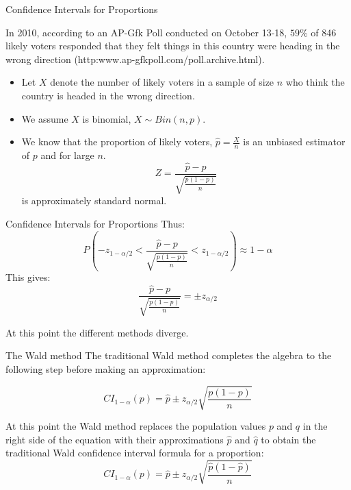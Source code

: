 \documentclass[
  ignorenonframetext,
]{beamer}
\begin{document}
\begin{frame}{Confidence Intervals for Proportions}
\protect\hypertarget{confidence-intervals-for-proportions}{}
\begin{tcolorbox}
In 2010, according to an AP-Gfk Poll conducted on October 13-18, $59\%$ of 846 likely voters responded that they felt things in this country were heading in the wrong direction (http:www.ap-gfkpoll.com/poll.archive.html). 
\end{tcolorbox}

\begin{itemize}
\item
  Let \(X\) denote the number of likely voters in a sample of size \(n\)
  who think the country is headed in the wrong direction.
\item
  We assume \(X\) is binomial, \(X\sim Bin(n, p)\).
\item
  We know that the proportion of likely voters, \(\hat{p}=\frac{X}{n}\)
  is an unbiased estimator of \(p\) and for large \(n\).
  \[Z=\frac{\hat{p}-p}{\sqrt{\frac{p(1-p)}{n}}}\] is approximately
  standard normal.
\end{itemize}
\end{frame}

\begin{frame}{Confidence Intervals for Proportions}
\protect\hypertarget{confidence-intervals-for-proportions-1}{}
Thus:
\[P\left(-z_{1-\alpha/2}<\frac{\hat{p}-p}{\sqrt{\frac{p(1-p)}{n}}}<z_{1-\alpha/2}\right)\approx 1-\alpha \]
This gives:
\[\frac{\hat{p}-p}{\sqrt{\frac{p(1-p)}{n}}}=\pm z_{\alpha/2}\]

At this point the different methods diverge.
\end{frame}

\begin{frame}{The Wald method}
\protect\hypertarget{the-wald-method}{}
The traditional Wald method completes the algebra to the following step
before making an approximation:

\[CI_{1 - \alpha}(p) = \hat{p}\pm z_{\alpha/2}\sqrt{\frac{p(1-p)}{n}}\]

At this point the Wald method replaces the population values \(p\) and
\(q\) in the right side of the equation with their approximations
\(\hat{p}\) and \(\hat{q}\) to obtain the traditional Wald confidence
interval formula for a proportion:
\[CI_{1 - \alpha}(p)=\hat{p}\pm z_{\alpha/2}\sqrt{\frac{\hat{p}(1-\hat{p})}{n}}\]
\end{frame}
\end{document}
